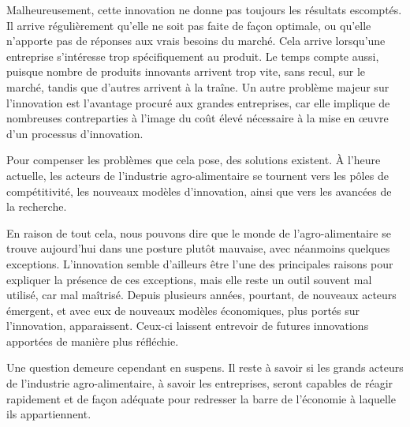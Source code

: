 \documentclass[a4paper,12pt]{report}
\begin{document}
    Malheureusement, cette innovation ne donne pas toujours les résultats escomptés. Il arrive régulièrement qu’elle ne soit pas faite de façon optimale, ou qu’elle n’apporte pas de réponses aux vrais besoins du marché. Cela arrive lorsqu’une entreprise s’intéresse trop spécifiquement au produit. Le temps compte aussi, puisque nombre de produits innovants arrivent trop vite, sans recul, sur le marché, tandis que d’autres arrivent à la traîne. Un autre problème majeur sur l’innovation est l’avantage procuré aux grandes entreprises, car elle implique de nombreuses contreparties à l’image du coût élevé nécessaire à la mise en œuvre d’un processus d’innovation.
    
    Pour compenser les problèmes que cela pose, des solutions existent. À l’heure actuelle, les acteurs de l’industrie agro-alimentaire se tournent vers les pôles de compétitivité, les nouveaux modèles d’innovation, ainsi que vers les avancées de la recherche.
    
    En raison de tout cela, nous pouvons dire que le monde de l'agro-alimentaire se trouve aujourd'hui dans une posture plutôt mauvaise, avec néanmoins quelques exceptions. L'innovation semble d'ailleurs être l'une des principales raisons pour expliquer la présence de ces exceptions, mais elle reste un outil souvent mal utilisé, car mal maîtrisé. Depuis plusieurs années, pourtant, de nouveaux acteurs émergent, et avec eux de nouveaux modèles économiques, plus portés sur l'innovation, apparaissent. Ceux-ci laissent entrevoir de futures innovations apportées de manière plus réfléchie.
    
    Une question demeure cependant en suspens. Il reste à savoir si les grands acteurs de l'industrie agro-alimentaire, à savoir les entreprises, seront capables de réagir rapidement et de façon adéquate pour redresser la barre de l'économie à laquelle ils appartiennent.

{}
\end{document}
